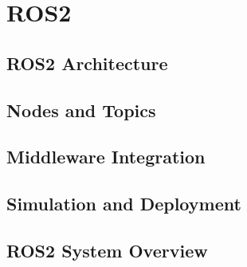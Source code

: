 \chapter{ROS2}

\section{ROS2 Architecture}

\section{Nodes and Topics}

\section{Middleware Integration}

\section{Simulation and Deployment}

\section{ROS2 System Overview}
